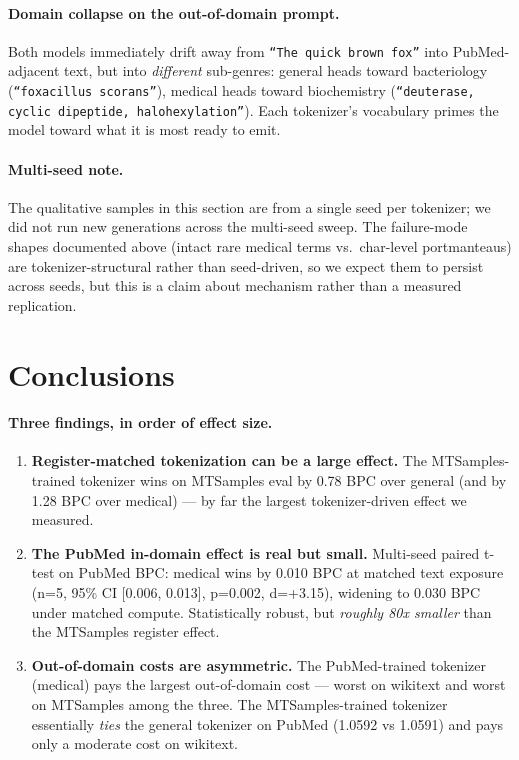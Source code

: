 \documentclass[11pt]{article}
\begin{document}
\paragraph{Domain collapse on the out-of-domain prompt.}
Both models immediately drift away from \texttt{``The quick brown fox''} into PubMed-adjacent text, but into \emph{different} sub-genres: general heads toward bacteriology (\texttt{``foxacillus scorans''}), medical heads toward biochemistry (\texttt{``deuterase, cyclic dipeptide, halohexylation''}). Each tokenizer's vocabulary primes the model toward what it is most ready to emit.

\paragraph{Multi-seed note.}
The qualitative samples in this section are from a single seed per tokenizer; we did not run new generations across the multi-seed sweep. The failure-mode shapes documented above (intact rare medical terms vs.\ char-level portmanteaus) are tokenizer-structural rather than seed-driven, so we expect them to persist across seeds, but this is a claim about mechanism rather than a measured replication.

\section{Conclusions}

\paragraph{Three findings, in order of effect size.}

\begin{enumerate}[leftmargin=*, itemsep=2pt]
    \item \textbf{Register-matched tokenization can be a large effect.} The MTSamples-trained tokenizer wins on MTSamples eval by 0.78 BPC over general (and by 1.28 BPC over medical) --- by far the largest tokenizer-driven effect we measured.
    \item \textbf{The PubMed in-domain effect is real but small.} Multi-seed paired t-test on PubMed BPC: medical wins by 0.010 BPC at matched text exposure (n=5, 95\% CI [0.006, 0.013], p=0.002, d=+3.15), widening to 0.030 BPC under matched compute. Statistically robust, but \emph{roughly 80x smaller} than the MTSamples register effect.
    \item \textbf{Out-of-domain costs are asymmetric.} The PubMed-trained tokenizer (medical) pays the largest out-of-domain cost --- worst on wikitext and worst on MTSamples among the three. The MTSamples-trained tokenizer essentially \emph{ties} the general tokenizer on PubMed (1.0592 vs 1.0591) and pays only a moderate cost on wikitext.
\end{enumerate}
\end{document}
